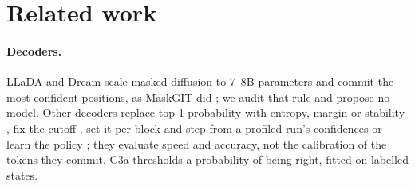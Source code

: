 
\section{Related work}
\label{sec:related}

\paragraph{Decoders.}
LLaDA and Dream \citep{nie2025llada,ye2025dream} scale masked diffusion \citep{sahoo2024mdlm}
to 7--8B parameters and commit the most confident positions, as MaskGIT did
\citep{chang2022maskgit}; we audit that rule and propose no model. Other decoders replace top-1
probability \citep{kim2025worst} with entropy, margin or stability
\citep{benhamu2025entropy,kim2025klass}, fix the cutoff \citep{wu2025fastdllm}, set it per block and step from a profiled run's confidences \citep{shen2025osdt} or
learn the policy \citep{jazbec2026learning}; they evaluate speed and accuracy, not the
calibration of the tokens they commit. C3a thresholds a probability of being right, fitted on labelled states.

